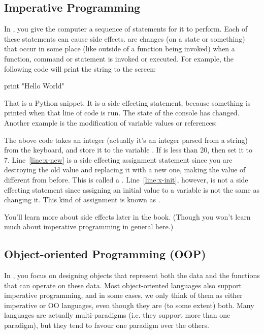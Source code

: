 \subsection{Imperative Programming}
In , you give the computer a sequence of statements for it to perform. Each of these statements can cause side effects.  are changes (on a state or something) that occur in some place (like outside of a function being invoked) when a function, command or statement is invoked or executed. For example, the following code will print the string  to the screen:
\begin{Python}
	print "Hello World"
\end{Python}
That is a Python snippet. It is a side effecting statement, because something is printed when that line of code is run. The state of the console has changed. Another example is the modification of variable values or references: 
\begin{Python}
	x = int(raw_input('Enter a number')) (*@\label{line:x-init}@*)
	if x < 20:
		x = 7 (*@{\label{line:x-new}@*)
\end{Python}
The above code takes an integer (actually it's an integer parsed from a string) from the keyboard, and store it to the variable . If  is less than 20, then set it to 7. Line~\ref{line:x-new} is a side effecting assignment statement since you are destroying the old value and replacing it with a new one, making the value of  different from before. This is called a . Line~\ref{line:x-init}, however, is not a side effecting statement since assigning an initial value to a variable is not the same as changing it. This kind of assignment is known as .

You'll learn more about side effects later in the book. (Though you won't learn much about imperative programming in general here.)

\subsection{Object-oriented Programming (OOP)}
In , you focus on designing objects that represent both the data and the functions that can operate on these data. Most object-oriented languages also support imperative programming, and in some cases, we only think of them as either imperative  or OO languages, even though they are (to some extent) both. Many languages are actually multi-paradigms (i.e. they support more than one paradigm), but they tend to favour one paradigm over the others. 

